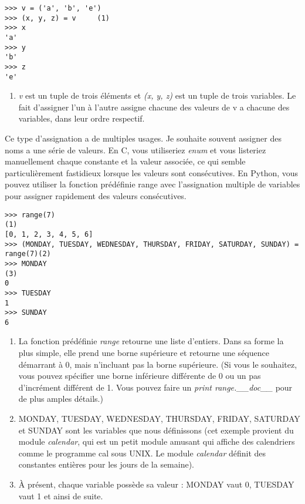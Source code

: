 \begin{example}
\begin{lstlisting}
>>> v = ('a', 'b', 'e')
>>> (x, y, z) = v     (1)
>>> x
'a'
>>> y
'b'
>>> z
'e'
\end{lstlisting}
\end{example}

\begin{enumerate}
\item {\emph{v} est un tuple de trois éléments et \emph{(x, y, z)} est un tuple de trois variables. Le fait d'assigner l'un à l'autre assigne chacune des valeurs de v a chacune des variables, dans leur ordre respectif.}
\end{enumerate}

Ce type d'assignation a de multiples usages. Je souhaite souvent assigner des noms a une série de valeurs. En C, vous utiliseriez \emph{enum} et vous listeriez manuellement chaque constante et la valeur associée, ce qui semble particulièrement fastidieux lorsque les valeurs sont consécutives. En Python, vous pouvez utiliser la fonction prédéfinie range avec l'assignation multiple de variables pour assigner rapidement des valeurs consécutives.

\begin{example}
\begin{lstlisting}
>>> range(7)                                                                    (1)
[0, 1, 2, 3, 4, 5, 6]
>>> (MONDAY, TUESDAY, WEDNESDAY, THURSDAY, FRIDAY, SATURDAY, SUNDAY) = range(7)(2)
>>> MONDAY                                                                      (3)
0
>>> TUESDAY
1
>>> SUNDAY
6
\end{lstlisting}
\end{example}

\begin{enumerate}
\item{La fonction prédéfinie \emph{range} retourne une liste d'entiers. Dans sa forme la plus simple, elle prend une borne supérieure et retourne une séquence démarrant à 0, mais n'incluant pas la borne supérieure. (Si vous le souhaitez, vous pouvez spécifier une borne inférieure différente de 0 ou un pas d'incrément différent de 1. Vous pouvez faire un \emph{print range.\_\_doc\_\_} pour de plus amples détails.)}
\item{MONDAY, TUESDAY, WEDNESDAY, THURSDAY, FRIDAY, SATURDAY et SUNDAY sont les variables que nous définissons (cet exemple provient du module \emph{calendar}, qui est un petit module amusant qui affiche des calendriers comme le programme cal sous UNIX. Le module \emph{calendar} définit des constantes entières pour les jours de la semaine).}
\item{À présent, chaque variable possède sa valeur : MONDAY vaut 0, TUESDAY vaut 1 et ainsi de suite.}
\end{enumerate}

